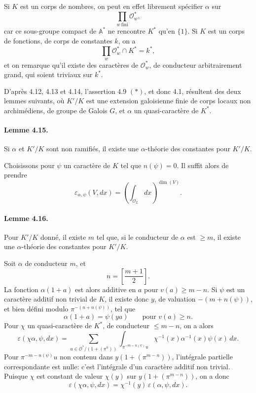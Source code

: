 \documentclass[10pt,letterpaper]{article}
\begin{document}
Si \(K\) est un corps de nombres, on peut en effet librement spécifier \(\alpha\) sur
\[
\prod_{w\ \mathrm{fini}}\mathcal O_w^*,
\]
car ce sous-groupe compact de \(\mathbb A^*\) ne rencontre \(K^*\) qu'en \(\{1\}\). Si \(K\) est un corps de fonctions, de corps de constantes \(k\), on a
\[
\prod_w\mathcal O_w^*\cap K^*=k^*,
\]
et on remarque qu'il existe des caractères de \(\mathcal O_w^*\), de conducteur arbitrairement grand, qui soient triviaux sur \(k^*\).

D'après 4.12, 4.13 et 4.14, l'assertion 4.9 \((*)\), et donc 4.1, résultent des deux lemmes suivants, où \(K'/K\) est une extension galoisienne finie de corps locaux non archimédiens, de groupe de Galois \(G\), et \(\alpha\) un quasi-caractère de \(K^*\).

\paragraph{Lemme 4.15.} Si \(\alpha\) et \(K'/K\) sont non ramifiés, il existe une \(\alpha\)-théorie des constantes pour \(K'/K\).

Choisissons pour \(\psi\) un caractère de \(K\) tel que \(n(\psi)=0\). Il suffit alors de prendre
\[
\varepsilon_{\alpha,\psi}(V,dx)=
\left(\int_{\mathcal O_L} dx\right)^{\dim(V)}.
\]

\paragraph{Lemme 4.16.} Pour \(K'/K\) donné, il existe \(m\) tel que, si le conducteur de \(\alpha\) est \(\ge m\), il existe une \(\alpha\)-théorie des constantes pour \(K'/K\).

Soit \(\alpha\) de conducteur \(m\), et
\[
n=\left[\frac{m+1}{2}\right].
\]
La fonction \(\alpha(1+a)\) est alors additive en \(a\) pour \(v(a)\ge m-n\). Si \(\psi\) est un caractère additif non trivial de \(K\), il existe donc \(y\), de valuation \(-(m+n(\psi))\), et bien défini modulo \(\pi^{-(n+n(\psi))}\), tel que
\[
\alpha(1+a)=\psi(ya)\qquad\text{pour }v(a)\ge n.
\]
Pour \(\chi\) un quasi-caractère de \(K^*\), de conducteur \(\le m-n\), on a alors
\[
\tag{4.16.1}
\varepsilon(\chi\alpha,\psi,dx)
=
\sum_{u\in\mathcal O^*/(1+(\pi^n))}
\int_{\pi^{-m-n(\psi)}u}
\chi^{-1}(x)\alpha^{-1}(x)\psi(x)\,dx.
\]
Pour \(\pi^{-m-n(\psi)}u\) non contenu dans \(y(1+(\pi^{m-n}))\), l'intégrale partielle correspondante est nulle: c'est l'intégrale d'un caractère additif non trivial. Puisque \(\chi\) est constant de valeur \(\chi(y)\) sur \(y(1+(\pi^{m-n}))\), on a donc
\[
\varepsilon(\chi\alpha,\psi,dx)
=
\chi^{-1}(y)\,\varepsilon(\alpha,\psi,dx).
\]
\end{document}
